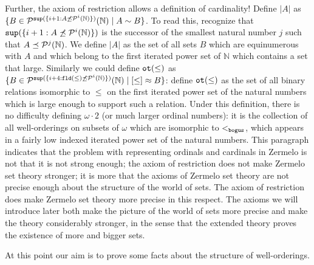 \documentclass[12pt]{book}
\begin{document}
\begin{description}
Further, the axiom of restriction allows a definition of cardinality!  Define $|A|$ as $\{B \in {\cal P}^{{\tt sup}(\{ i+1: A \not\preceq {\cal P}^i(\mathbb N)\})}(\mathbb N)\mid A \sim B\}$.  To read this, recognize that ${\tt sup}(\{ i+1: A \not\preceq {\cal P}^i(\mathbb N)\})$ is the successor of the smallest natural number $j$ such that $A \preceq {\cal P}^j(\mathbb N)$.  We define $|A|$ as the set of all sets $B$ which are equinumerous with $A$ and which belong to the first iterated power set of $\mathbb N$ which contains a set that large.  Similarly we could define ${\tt ot}(\leq)$ as
$\{B \in {\cal P}^{{\tt sup}(\{ i+4: {\tt fld}(\leq) \not\preceq {\cal P}^i(\mathbb N)\})}(\mathbb N)\mid [\leq] \approx B\}$:  define ${\tt ot}(\leq)$ as the set of all binary relations isomorphic to $\leq$ on the first iterated power set of the natural numbers which is large enough to support such a relation.  Under this definition, there is no difficulty defining $\omega \cdot 2$ (or much larger ordinal numbers):  it is the collection of all well-orderings on subsets of $\omega$ which are isomorphic to $<_{\tt bogus}$, which appears in a fairly low indexed iterated power set of the natural numbers.  This paragraph indicates that the problem with representing ordinals and cardinals in Zermelo is not that it is not strong enough;  the axiom of restriction does not make Zermelo set theory stronger;  it is more that the axioms of Zermelo set theory are not precise enough about the structure of the world of sets.   The axiom of restriction does make Zermelo set theory more precise in this respect.  The axioms we will introduce later both make the picture of the world of sets more precise and make the theory considerably stronger, in the sense that the extended theory proves the existence of more and bigger sets.

\end{description}

At this point our aim is to prove some facts about the structure of well-orderings.
\end{document}
